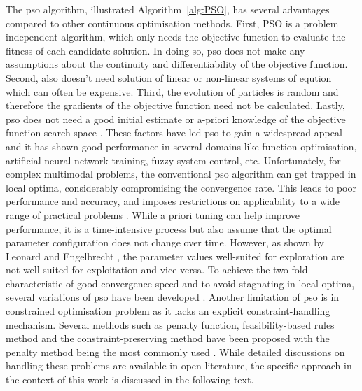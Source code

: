 	The \gls{pso} algorithm, illustrated Algorithm~\ref{alg:PSO}, has several advantages compared to other continuous optimisation methods. First, PSO is a problem independent algorithm, which only needs the objective function to evaluate the fitness of each candidate solution. In doing so, \gls{pso} does not make any assumptions about the continuity and differentiability of the objective function. Second, also doesn't need solution of linear or non-linear systems of eqution which can often be expensive. Third, the evolution of particles is random and therefore the gradients of the objective function need not be calculated. Lastly, \gls{pso} does not need a good initial estimate or a-priori knowledge of the objective function search space \cite{Freitas:2020aa}. These factors have led \gls{pso} to gain a widespread appeal and it has shown good performance in several domains like function optimisation, artificial neural network training, fuzzy system control, etc. Unfortunately, for complex multimodal problems, the conventional \gls{pso} algorithm can get trapped in local optima, considerably compromising the convergence rate. This leads to poor performance and accuracy, and imposes restrictions on applicability to a wide range of practical problems \cite{Xu:2013aa,Harrison:2018aa}. While a priori tuning can help improve performance, it is a time-intensive process but also assume that the optimal parameter configuration does not change over time. However, as shown by Leonard and Engelbrecht \cite{Leonard:2013aa}, the parameter values well-suited for exploration are not well-suited for exploitation and vice-versa. To achieve the two fold characteristic of good convergence speed and to avoid stagnating in local optima, several variations of \gls{pso} have been developed \cite{Shi:1998aa,Ratnaweera:2004aa,Chatterjee:2006aa,Fan:2007aa,van-den-Bergh:2001aa}. Another limitation of \gls{pso} is in constrained optimisation problem as it lacks an explicit constraint-handling mechanism. Several methods such as penalty function, feasibility-based rules method and the constraint-preserving method have been proposed with the penalty method being the most commonly used \cite{Sun:2011aa,Jordehi:2015aa}. While detailed discussions on handling these problems are available in open literature, the specific approach in the context of this work is discussed in the following text. 	
	
